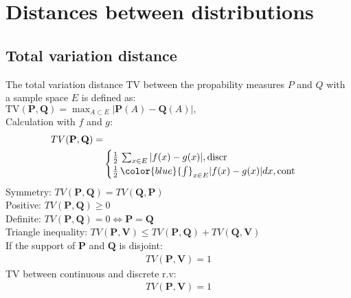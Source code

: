 \section{Distances between distributions}

\subsection{Total variation distance}
The total variation distance $\text {TV}$ between the propability measures $P$ and $Q$ with a sample space $E$ is defined as:\\
$\text {TV}(\mathbf{P}, \mathbf{Q}) = {\max _{A \subset E}}| \mathbf{P}(A) - \mathbf{Q}(A) |,$\\
Calculation with $f$ and $g$:
\begin{align*}
{TV}(\mathbf{P}, \mathbf{Q}) =&\\
	&\begin{cases}
		  \frac{1}{2} \, \sum _{x \in E} |f(x) - g(x)|,\text{discr}\\		 
		 \frac{1}{2} \, {\color{blue}{\int }} _{x \in E} |f(x) - g(x)|dx,\text{cont}
	\end{cases}	
\end{align*}
Symmetry: $TV(\mathbf{P}, \mathbf{Q}) = TV(\mathbf{Q}, \mathbf{P})$\\
Positive: $TV(\mathbf{P}, \mathbf{Q}) \geq 0$\\
Definite: $TV(\mathbf{P}, \mathbf{Q}) = 0 \iff \mathbf{P}= \mathbf{Q}$\\
Triangle inequality: $TV(\mathbf{P}, \mathbf{V}) \leq TV(\mathbf{P}, \mathbf{Q}) + TV(\mathbf{Q}, \mathbf{V})$\\

If the support of $\mathbf{P}$ and $\mathbf{Q}$ is disjoint:
\begin{align*}
TV(\mathbf{P}, \mathbf{V}) = 1
\end{align*}
TV between continuous and discrete r.v:
\begin{align*}
TV(\mathbf{P}, \mathbf{V}) = 1
\end{align*}

